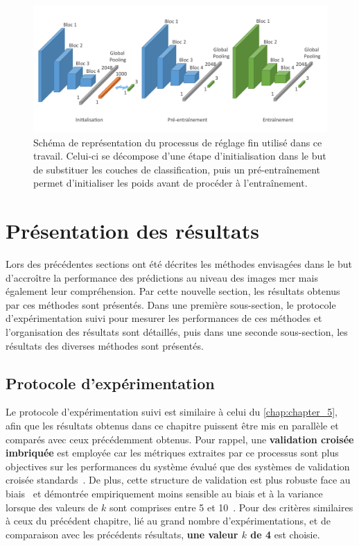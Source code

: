 \begin{figure}[H]
    \centering
    \includegraphics[width=\linewidth]{contents/chapter_6/resources/scheme_image_improvement_image_fine_tune.pdf}
    \caption{Schéma de représentation du processus de réglage fin utilisé dans ce travail. Celui-ci se décompose d'une étape d'initialisation dans le but de substituer les couches de classification, puis un pré-entraînement permet d'initialiser les poids avant de procéder à l'entraînement.}
    \label{fig:scheme_image_fine_tune}
\end{figure}\par
\clearpage

\section{Présentation des résultats}
Lors des précédentes sections ont été décrites les méthodes envisagées dans le but d'accroître la performance des prédictions au niveau des images \gls{mcr} mais également leur compréhension. Par cette nouvelle section, les résultats obtenus par ces méthodes sont présentés. Dans une première sous-section, le protocole d'expérimentation suivi pour mesurer les performances de ces méthodes et l'organisation des résultats sont détaillés, puis dans une seconde sous-section, les résultats des diverses méthodes sont présentés.\par

\subsection{Protocole d'expérimentation}
Le protocole d'expérimentation suivi est similaire à celui du \cref{chap:chapter_5}, afin que les résultats obtenus dans ce chapitre puissent être mis en parallèle et comparés avec ceux précédemment obtenus. Pour rappel, une \textbf{validation croisée imbriquée} est employée car les métriques extraites par ce processus sont plus objectives sur les performances du système évalué que des systèmes de validation croisée standards~\cite{Cawley2010}. De plus, cette structure de validation est plus robuste face au biais~\cite{Cawley2010} et démontrée empiriquement moins sensible au biais et à la variance lorsque des valeurs de $k$ sont comprises entre 5 et 10~\cite{James2013}. Pour des critères similaires à ceux du précédent chapitre, lié au grand nombre d'expérimentations, et de comparaison avec les précédents résultats, \textbf{une valeur $k$ de 4} est choisie.\par

